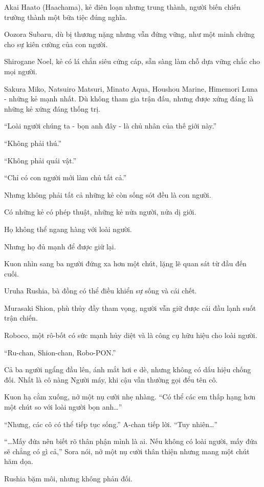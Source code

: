 \documentclass[../main.tex]{subfiles}
\begin{document}
Akai Haato (Haachama), kẻ điên loạn nhưng trung thành, người biến chiến trường thành một bữa tiệc đúng nghĩa.

Oozora Subaru, dù bị thương nặng nhưng vẫn đứng vững, như một minh chứng cho sự kiên cường của con người.

Shirogane Noel, kẻ có lá chắn siêu cứng cáp, sẵn sàng làm chỗ dựa vững chắc cho mọi người.

Sakura Miko, Natsuiro Matsuri, Minato Aqua,  Houshou Marine, Himemori Luna - những kẻ mạnh nhất. Dù không tham gia trận đấu, nhưng được xứng đáng là những kẻ xứng đáng thống trị.

``Loài người chúng ta - bọn anh đây - là chủ nhân của thế giới này.''

``Không phải thú.''

``Không phải quái vật.''

``Chỉ có con người mới làm chủ tất cả.''

Nhưng không phải tất cả những kẻ còn sống sót đều là con người.

Có những kẻ có phép thuật, những kẻ nửa người, nửa dị giới.

Họ không thể ngang hàng với loài người.

Nhưng họ đủ mạnh để được giữ lại.

Kuon nhìn sang ba người đứng xa hơn một chút, lặng lẽ quan sát từ đầu đến cuối.

Uruha Rushia, bà đồng có thể điều khiển sự sống và cái chết.

Murasaki Shion, phù thủy đầy tham vọng, người vẫn giữ được cái đầu lạnh suốt trận chiến.

Roboco, một rô-bốt có sức mạnh hủy diệt và là công cụ hữu hiệu cho loài người.

``Ru-chan, Shion-chan, Robo-PON.''

Cả ba người ngẩng đầu lên, ánh mắt hơi e dè, nhưng không có dấu hiệu chống đối. Nhất là cô nàng Người máy, khi cậu vẫn thường gọi đểu tên cô.

Kuon hạ cằm xuống, nở một nụ cười nhẹ nhàng. ``Có thể các em thấp hạng hơn một chút so với loài người bọn anh\dots''

``Nhưng, các cô có thể tiếp tục sống.'' A-chan tiếp lời. ``Tuy nhiên\dots''

``\dots Mấy đứa nên biết rõ thân phận mình là ai. Nếu không có loài người, mấy đứa sẽ chẳng có gì cả,'' Sora nói, nở một nụ cười thân thiện nhưng mang một chút hăm dọa.

Rushia bặm môi, nhưng không phản đối.
\end{document}

